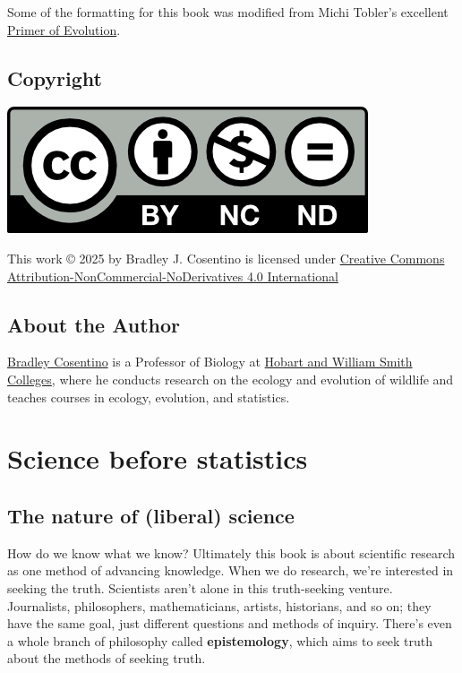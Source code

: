 \documentclass[
]{book}
\begin{document}
Some of the formatting for this book was modified from Michi Tobler's excellent \href{https://michitobler.github.io/primer-of-evolution/}{Primer of Evolution}.

\section*{Copyright}\label{copyright}

\begin{flushleft}\includegraphics[width=0.1\linewidth]{images/i_cc-logo.f0ab4ebe} \end{flushleft}

This work © 2025 by Bradley J. Cosentino is licensed under \href{https://creativecommons.org/licenses/by-nc-nd/4.0/}{Creative Commons Attribution-NonCommercial-NoDerivatives 4.0 International}

\section*{About the Author}\label{about-the-author}

\href{https://landscapemosaic.org/}{Bradley Cosentino} is a Professor of Biology at \href{https://www.hws.edu/}{Hobart and William Smith Colleges}, where he conducts research on the ecology and evolution of wildlife and teaches courses in ecology, evolution, and statistics.

\chapter{Science before statistics}\label{science-before-statistics}

\section{The nature of (liberal) science}\label{the-nature-of-liberal-science}

How do we know what we know? Ultimately this book is about scientific research as one method of advancing knowledge. When we do research, we're interested in seeking the truth. Scientists aren't alone in this truth-seeking venture. Journalists, philosophers, mathematicians, artists, historians, and so on; they have the same goal, just different questions and methods of inquiry. There's even a whole branch of philosophy called \textbf{epistemology}, which aims to seek truth about the methods of seeking truth.
\end{document}
